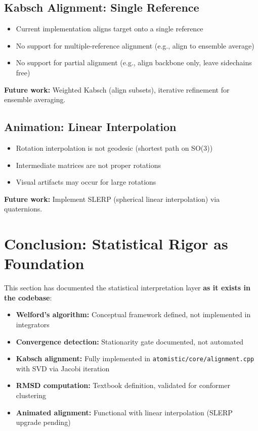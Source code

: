 \documentclass[11pt]{article}
\begin{document}
\subsection{Kabsch Alignment: Single Reference}

\begin{itemize}
\item Current implementation aligns target onto a single reference
\item No support for multiple-reference alignment (e.g., align to ensemble average)
\item No support for partial alignment (e.g., align backbone only, leave sidechains free)
\end{itemize}

\textbf{Future work:} Weighted Kabsch (align subsets), iterative refinement for ensemble averaging.

\subsection{Animation: Linear Interpolation}

\begin{itemize}
\item Rotation interpolation is not geodesic (shortest path on SO(3))
\item Intermediate matrices are not proper rotations
\item Visual artifacts may occur for large rotations
\end{itemize}

\textbf{Future work:} Implement SLERP (spherical linear interpolation) via quaternions.

\section{Conclusion: Statistical Rigor as Foundation}

This section has documented the statistical interpretation layer \textbf{as it exists in the codebase}:

\begin{itemize}
\item \textbf{Welford's algorithm:} Conceptual framework defined, not implemented in integrators
\item \textbf{Convergence detection:} Stationarity gate documented, not automated
\item \textbf{Kabsch alignment:} Fully implemented in \texttt{atomistic/core/alignment.cpp} with SVD via Jacobi iteration
\item \textbf{RMSD computation:} Textbook definition, validated for conformer clustering
\item \textbf{Animated alignment:} Functional with linear interpolation (SLERP upgrade pending)
\end{itemize}
\end{document}

